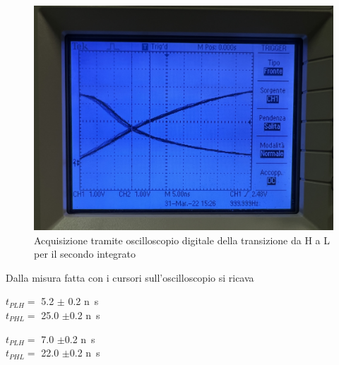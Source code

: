 \documentclass[10pt, a4paper, italian]{article}
\begin{document}
\begin{figure}[htbp]
\centering
	\includegraphics[width=\textwidth]{HL2}
	\caption{Acquisizione tramite oscilloscopio digitale della transizione da
	H a L per il secondo integrato}
\end{figure}

Dalla misura fatta con i cursori sull'oscilloscopio si ricava
\begin{multicols}{2}
    \centering
    $t_{PLH}=$ 5.2 $\pm$ 0.2 \si{n\s} \\
    $t_{PHL}=$ 25.0 $\pm$0.2 \si{n\s}
    
    $t_{PLH}=$ 7.0 $\pm$0.2 \si{n\s} \\
    $t_{PHL}=$ 22.0 $\pm$0.2 \si{n\s}
\end{multicols}
\end{document}
